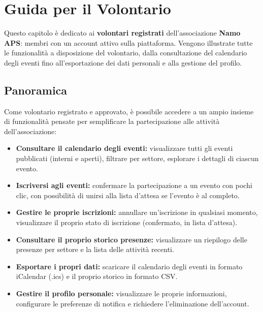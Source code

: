 \documentclass[a4paper,11pt,oneside]{book}
\newcommand{\namoaps}{\textbf{Namo APS}}
\begin{document}
\chapter{Guida per il Volontario}
\label{ch:guida-volontario}

Questo capitolo \`e dedicato ai \textbf{volontari registrati} dell'associazione \namoaps{}: membri con un account attivo sulla piattaforma. Vengono illustrate tutte le funzionalit\`a a disposizione del volontario, dalla consultazione del calendario degli eventi fino all'esportazione dei dati personali e alla gestione del profilo.

\section{Panoramica}
\label{sec:volontario-panoramica}

Come volontario registrato e approvato, \`e possibile accedere a un ampio insieme di funzionalit\`a pensate per semplificare la partecipazione alle attivit\`a dell'associazione:

\begin{itemize}[leftmargin=1.5em]
  \item \textbf{Consultare il calendario degli eventi:} visualizzare tutti gli eventi pubblicati (interni e aperti), filtrare per settore, esplorare i dettagli di ciascun evento.
  \item \textbf{Iscriversi agli eventi:} confermare la partecipazione a un evento con pochi clic, con possibilit\`a di unirsi alla lista d'attesa se l'evento \`e al completo.
  \item \textbf{Gestire le proprie iscrizioni:} annullare un'iscrizione in qualsiasi momento, visualizzare il proprio stato di iscrizione (confermato, in lista d'attesa).
  \item \textbf{Consultare il proprio storico presenze:} visualizzare un riepilogo delle presenze per settore e la lista delle attivit\`a recenti.
  \item \textbf{Esportare i propri dati:} scaricare il calendario degli eventi in formato iCalendar (.ics) e il proprio storico in formato CSV.
  \item \textbf{Gestire il profilo personale:} visualizzare le proprie informazioni, configurare le preferenze di notifica e richiedere l'eliminazione dell'account.
\end{itemize}
\end{document}
